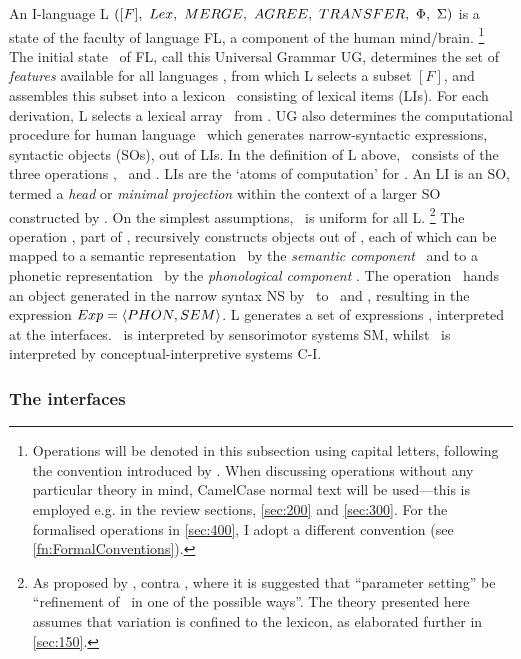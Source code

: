 An I-language L $([F],\ \Lex,\ \MERGE,\ \AGREE,\ \TRANSFER,\ \fSM,\ \fCI)$ is a state of the faculty of language FL, a component of the human mind/brain.%
\footnote{Operations will be denoted in this subsection using capital letters, following the convention introduced by \textcite{ChomskyN.etal_2019}. When discussing operations without any particular theory in mind, CamelCase normal text will be used---this is employed e.g. in the review sections, \autoref{sec:200} and \autoref{sec:300}. For the formalised operations in \autoref{sec:400}, I adopt a different convention (see \autoref{fn:FormalConventions}).}
The initial state \Szero\ of FL, call this Universal Grammar UG, determines the set of \textit{features} available for all languages \setF, from which L selects a subset $[F]$, and assembles this subset into a lexicon \Lex\ consisting of lexical items (LIs). For each derivation, L selects a lexical array \LA\ from \Lex. UG also determines the computational procedure for human language \CHL\ which generates narrow-syntactic expressions, syntactic objects (SOs), out of LIs. In the definition of L above, \CHL\ consists of the three operations \MERGE, \TRANSFER\ and \AGREE. LIs are the `atoms of computation' for \CHL. An LI is an SO, termed a \textit{head} or \textit{minimal projection} within the context of a larger SO constructed by \CHL. On the simplest assumptions, \CHL\ is uniform for all L.%
\footnote{As proposed by \textcite[107]{ChomskyN_2004}, contra \textcite[100]{ChomskyN_2000}, where it is suggested that ``parameter setting'' be ``refinement of \CHL\ in one of the possible ways''. The theory presented here assumes that variation is confined to the lexicon, as elaborated further in \autoref{sec:150}.}
The operation \MERGE, part of \CHL, recursively constructs objects out of \LA, each of which can be mapped to a semantic representation \SEM\ by the \textit{semantic component} \fCI\ and to a phonetic representation \PHON\ by the \textit{phonological component} \fSM. The operation \TRANSFER\ hands an object generated in the narrow syntax NS by \MERGE\ to \fCI\ and \fSM, resulting in the expression $Exp=\langle PHON, SEM\rangle$. L generates a set of expressions \setExp, interpreted at the interfaces. \PHON\ is interpreted by sensorimotor systems SM, whilst \SEM\ is interpreted by conceptual-interpretive systems C-I.

\subsubsection{The interfaces}\label{sec:142}

